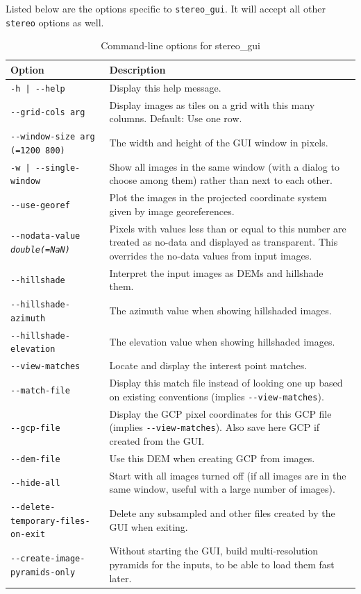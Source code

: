 \clearpage
Listed below are the options specific to \texttt{stereo\_gui}. It will accept
all other \texttt{stereo} options as well.

\begin{longtable}{|l|p{7.5cm}|}
\caption{Command-line options for stereo\_gui}
\label{tbl:stereogui}
\endfirsthead
\endhead
\endfoot
\endlastfoot
\hline
Option & Description \\ \hline \hline
\texttt{-h | -\/-help } & Display this help message.\\ \hline
\texttt{-\/-grid-cols arg} & Display images as tiles on a grid with this many columns. Default: Use one row.\\ \hline
\texttt{-\/-window-size arg (=1200 800)} & The width and height of the GUI window in pixels.\\ \hline
\texttt{-w | -\/-single-window } & Show all images in the same window (with a dialog to choose among them) rather than next to each other.\\ \hline
\texttt{-\/-use-georef} & Plot the images in the projected coordinate system given by image georeferences.\\ \hline
\texttt{-\/-nodata-value \textit{double(=NaN)}} & 
Pixels with values less than or equal to this number are treated as no-data and displayed as transparent. This overrides the no-data values from input images.
\\ \hline
\texttt{-\/-hillshade} & Interpret the input images as DEMs and hillshade them.\\ \hline
\texttt{-\/-hillshade-azimuth} & The azimuth value when showing hillshaded images.\\ \hline
\texttt{-\/-hillshade-elevation} & The elevation value when showing hillshaded images.\\ \hline
\texttt{-\/-view-matches} & Locate and display the interest point matches.\\ \hline
\texttt{-\/-match-file} & Display this match file instead of looking one up based on existing conventions (implies \texttt{-\/-view-matches}). \\ \hline
\texttt{-\/-gcp-file} & Display the GCP pixel coordinates for this GCP file (implies \texttt{-\/-view-matches}). Also save here GCP if created from the GUI.\\ \hline
\texttt{-\/-dem-file} & Use this DEM when creating GCP from images. \\ \hline
\texttt{-\/-hide-all} & Start with all images turned off (if all images are in the same window, useful with a large number of images).\\ \hline
\texttt{-\/-delete-temporary-files-on-exit} & Delete any subsampled and other files created by the GUI when exiting.\\ \hline
\texttt{-\/-create-image-pyramids-only} & Without starting the GUI, build multi-resolution pyramids for the inputs, to be able to load them fast later.\\ \hline
\end{longtable}

